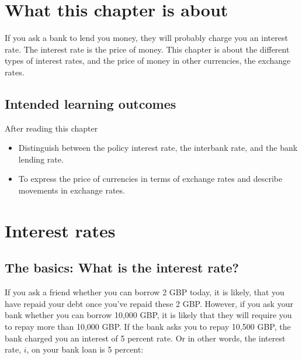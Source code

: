 \documentclass[
]{book}
\providecommand{\tightlist}{%
  \setlength{\itemsep}{0pt}\setlength{\parskip}{0pt}}
\begin{document}
\hypertarget{what-this-chapter-is-about-5}{%
\section{What this chapter is about}\label{what-this-chapter-is-about-5}}

If you ask a bank to lend you money, they will probably charge you an interest rate. The interest rate is the price of money. This chapter is about the different types of interest rates, and the price of money in other currencies, the exchange rates.

\hypertarget{intended-learning-outcomes-5}{%
\subsection*{Intended learning outcomes}\label{intended-learning-outcomes-5}}

After reading this chapter

\begin{itemize}
\tightlist
\item
  Distinguish between the policy interest rate, the interbank rate, and the bank lending rate.
\item
  To express the price of currencies in terms of exchange rates and describe movements in exchange rates.
\end{itemize}

\hypertarget{interest-rates}{%
\section{Interest rates}\label{interest-rates}}

\hypertarget{the-basics-what-is-the-interest-rate}{%
\subsection*{The basics: What is the interest rate?}\label{the-basics-what-is-the-interest-rate}}

If you ask a friend whether you can borrow 2 GBP today, it is likely, that you have repaid your debt once you've repaid these 2 GBP. However, if you ask your bank whether you can borrow 10,000 GBP, it is likely that they will require you to repay more than 10,000 GBP. If the bank asks you to repay 10,500 GBP, the bank charged you an interest of 5 percent rate. Or in other words, the interest rate, \(i\), on your bank loan is 5 percent:
\end{document}
